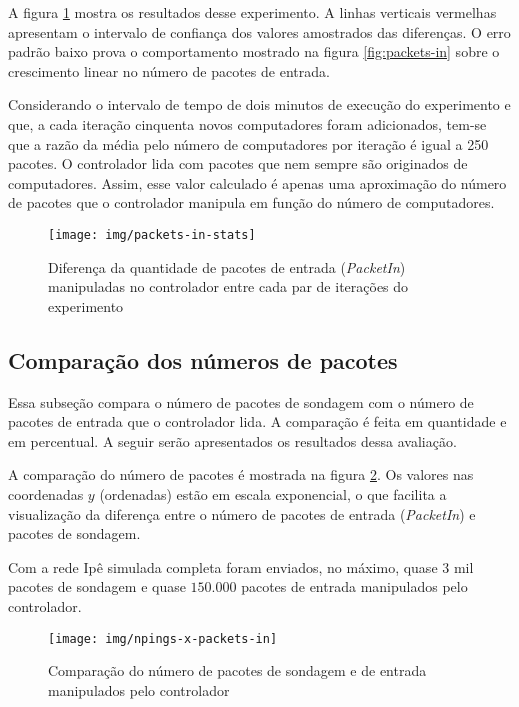 A figura \ref{fig:packets-in-stats} mostra os resultados desse experimento.
A linhas verticais vermelhas apresentam o intervalo de confiança dos valores
amostrados das diferenças.
O erro padrão baixo prova o comportamento mostrado na figura
\ref{fig:packets-in} sobre o crescimento linear no número de pacotes de
entrada.

Considerando o intervalo de tempo de dois minutos de execução do experimento e
que, a cada iteração cinquenta novos computadores foram adicionados,
tem-se que a razão da média pelo número de computadores por iteração é igual
a 250 pacotes.
O controlador lida com pacotes que nem sempre são originados de computadores.
Assim, esse valor calculado é apenas uma aproximação do número de pacotes
que o controlador manipula em função do número de computadores.

\begin{figure}[!htb]
    \centering
    \label{fig:packets-in-stats}
    \texttt{[image: img/packets-in-stats]}
    \caption{Diferença da quantidade de pacotes de entrada (\emph{PacketIn})
    manipuladas no controlador entre cada par de iterações do experimento}
\end{figure}

\subsection{Comparação dos números de pacotes}

Essa subseção compara o número de pacotes de sondagem com o número de pacotes
de entrada que o controlador lida.
A comparação é feita em quantidade e em percentual.
A seguir serão apresentados os resultados dessa avaliação.

A comparação do número de pacotes é mostrada na figura
\ref{fig:npings-x-packets-in}.
Os valores nas coordenadas $y$ (ordenadas) estão em escala exponencial, o que
facilita a visualização da diferença entre o número de pacotes de entrada
(\emph{PacketIn}) e pacotes de sondagem.

Com a rede Ipê simulada completa foram enviados, no máximo, quase $3$ mil
pacotes de sondagem e quase $150.000$ pacotes de entrada manipulados pelo
controlador.
\break
\begin{figure}[!htb]
    \centering
    \label{fig:npings-x-packets-in}
    \texttt{[image: img/npings-x-packets-in]}
    \caption{Comparação do número de pacotes de sondagem e de entrada
    manipulados pelo controlador}
\end{figure}

